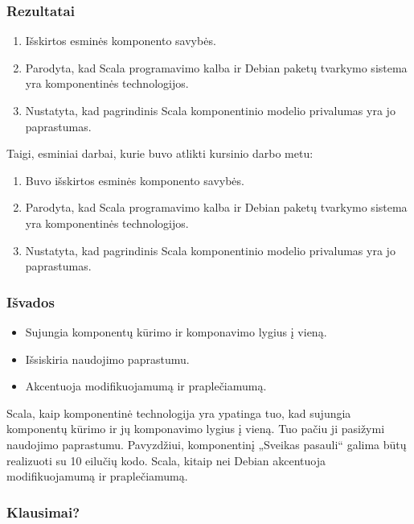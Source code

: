 \begin{frame}
  \frametitle{Rezultatai}
  \begin{enumerate}
    \item Išskirtos esminės komponento savybės.
    \item Parodyta, kad Scala programavimo kalba ir Debian paketų
      tvarkymo sistema yra komponentinės technologijos.
    \item Nustatyta, kad pagrindinis Scala komponentinio modelio
      privalumas yra jo paprastumas.
  \end{enumerate}
  \begin{handout}
    Taigi, esminiai darbai, kurie buvo atlikti kursinio darbo metu:
    \begin{enumerate}
      \item Buvo išskirtos esminės komponento savybės.
      \item Parodyta, kad Scala programavimo kalba ir Debian paketų
        tvarkymo sistema yra komponentinės technologijos.
      \item Nustatyta, kad pagrindinis Scala komponentinio modelio
        privalumas yra jo paprastumas.
    \end{enumerate}
  \end{handout}
\end{frame}

\begin{frame}
  \frametitle{Išvados}
  \begin{itemize}
    \item Sujungia komponentų kūrimo ir komponavimo lygius į vieną.
    \item Išsiskiria naudojimo paprastumu.
    \item Akcentuoja modifikuojamumą ir praplečiamumą.
  \end{itemize}
  \begin{handout}
    Scala, kaip komponentinė technologija yra ypatinga tuo, kad
    sujungia komponentų kūrimo ir jų komponavimo lygius į vieną.
    Tuo pačiu ji pasižymi naudojimo paprastumu. Pavyzdžiui, komponentinį
    „Sveikas pasauli“ galima būtų realizuoti su 10 eilučių kodo.
    Scala, kitaip nei Debian akcentuoja modifikuojamumą ir praplečiamumą.
  \end{handout}
\end{frame}

\begin{frame}
  \frametitle{Klausimai?}
\end{frame}
